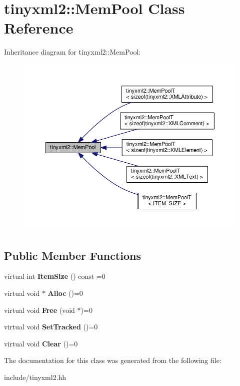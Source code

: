 \hypertarget{classtinyxml2_1_1MemPool}{}\section{tinyxml2\+:\+:Mem\+Pool Class Reference}
\label{classtinyxml2_1_1MemPool}


Inheritance diagram for tinyxml2\+:\+:Mem\+Pool\+:
\nopagebreak
\begin{figure}[H]
\begin{center}
\leavevmode
\includegraphics[width=350pt]{classtinyxml2_1_1MemPool__inherit__graph}
\end{center}
\end{figure}
\subsection*{Public Member Functions}
\begin{DoxyCompactItemize}
\item 
virtual int {\bfseries Item\+Size} () const =0\hypertarget{classtinyxml2_1_1MemPool_a0c518d49e3a94bde566f61e13b7240bb}{}\label{classtinyxml2_1_1MemPool_a0c518d49e3a94bde566f61e13b7240bb}

\item 
virtual void $\ast$ {\bfseries Alloc} ()=0\hypertarget{classtinyxml2_1_1MemPool_a4f977b5fed752c0bbfe5295f469d6449}{}\label{classtinyxml2_1_1MemPool_a4f977b5fed752c0bbfe5295f469d6449}

\item 
virtual void {\bfseries Free} (void $\ast$)=0\hypertarget{classtinyxml2_1_1MemPool_a49e3bfac2cba2ebd6776b31e571f64f7}{}\label{classtinyxml2_1_1MemPool_a49e3bfac2cba2ebd6776b31e571f64f7}

\item 
virtual void {\bfseries Set\+Tracked} ()=0\hypertarget{classtinyxml2_1_1MemPool_ac5804dd1387b2e4de5eef710076a0db1}{}\label{classtinyxml2_1_1MemPool_ac5804dd1387b2e4de5eef710076a0db1}

\item 
virtual void {\bfseries Clear} ()=0\hypertarget{classtinyxml2_1_1MemPool_a74fcdef9756917c8ae19fbbb4d658ed7}{}\label{classtinyxml2_1_1MemPool_a74fcdef9756917c8ae19fbbb4d658ed7}

\end{DoxyCompactItemize}


The documentation for this class was generated from the following file\+:\begin{DoxyCompactItemize}
\item 
include/tinyxml2.\+hh\end{DoxyCompactItemize}
